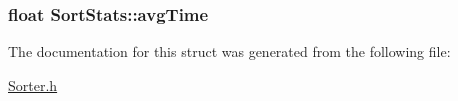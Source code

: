 \subsubsection[{\texorpdfstring{avg\+Time}{avgTime}}]{\setlength{\rightskip}{0pt plus 5cm}float Sort\+Stats\+::avg\+Time}\hypertarget{struct_sort_stats_a07d8638cfe1302952cb20a607afc8e39}{}\label{struct_sort_stats_a07d8638cfe1302952cb20a607afc8e39}


The documentation for this struct was generated from the following file\+:\begin{DoxyCompactItemize}
\item 
\hyperlink{_sorter_8h}{Sorter.\+h}\end{DoxyCompactItemize}
